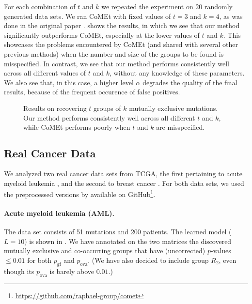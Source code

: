 For each combination of $t$ and $k$ we repeated the experiment on $20$ randomly generated data sets.
We ran CoMEt with fixed values of $t = 3$ and $k = 4$, as was done in the original paper \citep{comet}.
 shows the results, in which we see that our method significantly outperforms CoMEt, especially at the lower values of $t$ and $k$.
This showcases the problems encountered by CoMEt (and shared with several other previous methods) when the number and size of the groups to be found is misspecified.
In contrast, we see that our method performs consistently well across all different values of $t$ and $k$, without any knowledge of these parameters.
We also see that, in this case, a higher level $\alpha$ degrades the quality of the final results, because of the frequent occurence of false positives.


\setlength{}
\setlength{}
\begin{figure}[htb]
  \centering
  
  \caption{Results on recovering $t$ groups of $k$ mutually exclusive mutations.
Our method performs consistently well across all different $t$ and $k$, while CoMEt performs poorly when $t$ and $k$ are misspecified.
  }
  \label{fig:syn_multi}
\end{figure}

\subsection{Real Cancer Data}
We analyzed two real cancer data sets from TCGA, the first pertaining to acute myeloid leukemia \citep{tcga_aml}, and the second to breast cancer \citep{tcga_brca}.
For both data sets, we used the preprocessed versions by \cite{comet} available on GitHub\footnote{\url{https://github.com/raphael-group/comet}}.

\paragraph{Acute myeloid leukemia (AML).}
The data set consists of 51 mutations and 200 patients.
The learned \fldc{} model ($L = 10$) is shown in .
We have annotated on the two matrices the discovered mutually exclusive and co-occurring groups that have (uncorrected) $p$-values $\leq 0.01$ for both $p_{\mathrm{gf}}$ and $p_{\mathrm{ova}}$.
(We have also decided to include group $R_2$, even though its $p_{\mathrm{ova}}$ is barely above $0.01$.)

